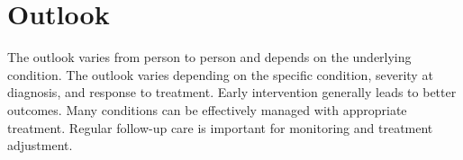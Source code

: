 \section{Outlook}
The outlook varies from person to person and depends on the underlying condition. The outlook varies depending on the specific condition, severity at diagnosis, and response to treatment. Early intervention generally leads to better outcomes. Many conditions can be effectively managed with appropriate treatment. Regular follow-up care is important for monitoring and treatment adjustment.
